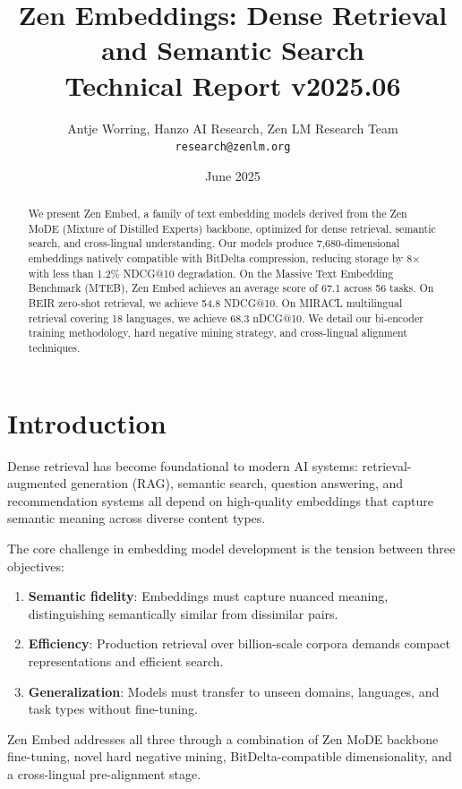 \documentclass[11pt,a4paper]{article}
\title{\textbf{Zen Embeddings: Dense Retrieval and Semantic Search}\\
\large Technical Report v2025.06}
\author{Antje Worring, Hanzo AI Research, Zen LM Research Team\\
\texttt{research@zenlm.org}}
\date{June 2025}
\begin{document}
\maketitle

\begin{abstract}
We present Zen Embed, a family of text embedding models derived from the Zen MoDE (Mixture of Distilled Experts) backbone, optimized for dense retrieval, semantic search, and cross-lingual understanding. Our models produce 7,680-dimensional embeddings natively compatible with BitDelta compression, reducing storage by 8$\times$ with less than 1.2\% NDCG@10 degradation. On the Massive Text Embedding Benchmark (MTEB), Zen Embed achieves an average score of 67.1 across 56 tasks. On BEIR zero-shot retrieval, we achieve 54.8 NDCG@10. On MIRACL multilingual retrieval covering 18 languages, we achieve 68.3 nDCG@10. We detail our bi-encoder training methodology, hard negative mining strategy, and cross-lingual alignment techniques.
\end{abstract}

\section{Introduction}

Dense retrieval has become foundational to modern AI systems: retrieval-augmented generation (RAG), semantic search, question answering, and recommendation systems all depend on high-quality embeddings that capture semantic meaning across diverse content types.

The core challenge in embedding model development is the tension between three objectives:
\begin{enumerate}
  \item \textbf{Semantic fidelity}: Embeddings must capture nuanced meaning, distinguishing semantically similar from dissimilar pairs.
  \item \textbf{Efficiency}: Production retrieval over billion-scale corpora demands compact representations and efficient search.
  \item \textbf{Generalization}: Models must transfer to unseen domains, languages, and task types without fine-tuning.
\end{enumerate}

Zen Embed addresses all three through a combination of Zen MoDE backbone fine-tuning, novel hard negative mining, BitDelta-compatible dimensionality, and a cross-lingual pre-alignment stage.
\end{document}
